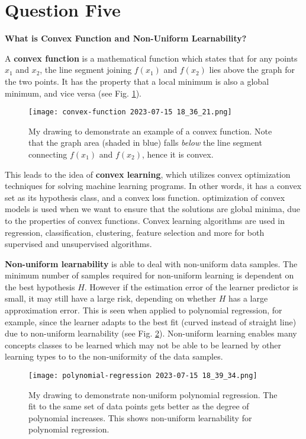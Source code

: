 \documentclass{article}
\begin{document}
\section{Question Five}
\noindent \textbf{What is Convex Function and Non-Uniform Learnability?}

A \textbf{convex function} is a mathematical function which states that for any points $x_1$ and $x_2$, the line segment joining $f(x_1)$ and $f(x_2)$ lies above the graph for the two points. It has the property that a local minimum is also a global minimum, and vice versa (see Fig. \ref{convex-function}). 

\begin{figure}
    \centering
    \texttt{[image: convex-function 2023-07-15 18\_36\_21.png]}
    \caption{My drawing to demonstrate an example of a convex function. Note that the graph area (shaded in blue) falls \textit{below} the line segment connecting $f(x_1)$ and $f(x_2)$, hence it is convex.}
    \label{convex-function}
\end{figure}

This leads to the idea of \textbf{convex learning}, which utilizes convex optimization techniques for solving machine learning programs. In other words, it has a convex set as its hypothesis class, and a convex loss function. optimization of convex models is used when we want to ensure that the solutions are global minima, due to the properties of convex functions.  Convex learning algorithms are used in regression, classification, clustering, feature selection and more for both supervised and unsupervised algorithms.

\textbf{Non-uniform learnability} is able to deal with non-uniform data samples. The minimum number of samples required for non-uniform learning is dependent on the best hypothesis $H$. However if the estimation error of the learner predictor is small, it may still have a large risk, depending on whether $H$ has a large approximation error. This is seen when applied to polynomial regression, for example, since the learner adapts to the best fit (curved instead of straight line) due to non-uniform learnability (see Fig. \ref{polynomial-regression}). Non-uniform learning enables many concepts classes to be learned which may not be able to be learned by other learning types to to the non-uniformity of the data samples.

\begin{figure}
    \centering
    \texttt{[image: polynomial-regression 2023-07-15 18\_39\_34.png]}
    \caption{My drawing to demonstrate non-uniform polynomial regression. The fit to the same set of data points gets better as the degree of polynomial increases. This shows non-uniform learnability for polynomial regression.}
    \label{polynomial-regression}
\end{figure}
\end{document}
